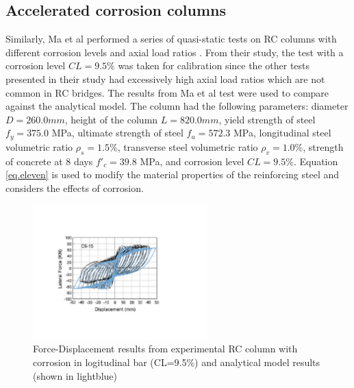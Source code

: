 \subsection{Accelerated corrosion columns}
Similarly, Ma et al performed a series of quasi-static tests on RC columns with different corrosion levels and axial load ratios \cite{Ma2012}. From their study, the test with a corrosion level $CL=9.5\%$ was taken for calibration since the other tests presented in their study had excessively high axial load ratios which are not common in RC bridges. The results from Ma et al test	\cite{Ma2012} were used to compare against the analytical model. The column had the following parameters: diameter $D = 260.0 mm$, height of the column $L = 820.0 mm$, yield strength of steel $f_{y} = 375.0$ MPa, ultimate strength of steel $f_{u} = 572.3$ MPa, longitudinal steel volumetric ratio $\rho_{s} = 1.5\% $, transverse steel volumetric ratio $\rho_{v} = 1.0\% $, strength of concrete at 8 days $f'_{c} = 39.8$ MPa, and corrosion level $CL=9.5\%$. Equation \ref{eq.eleven} is used to modify the material properties of the reinforcing steel and considers the effects of corrosion. 

\begin{figure}[htbp]
	\centering
	\includegraphics[width=0.60\textwidth]{Chapter-5/figs/Model_Calibration_Ma2012}
	\caption{Force-Displacement results from experimental RC column with corrosion in logitudinal bar (CL=9.5\%) \cite{Ma2012} and analytical model results (shown in lightblue)}
	\label{fig:ModelCalibration_Corrosion}
\end{figure}

